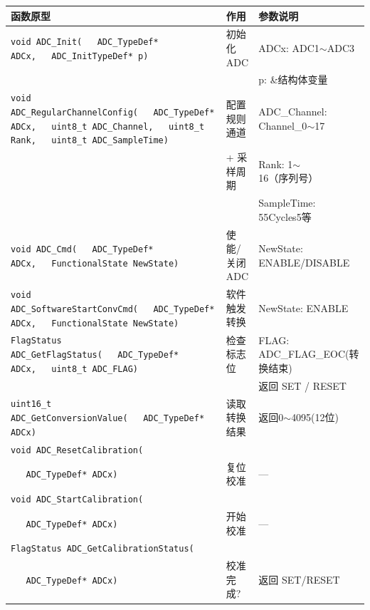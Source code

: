 \documentclass[10pt,a4paper,oneside]{ctexart}
\begin{document}
\begin{center}
\begin{tabular}{@{}p{5.8cm}p{2cm}p{3.2cm}@{}}
    \toprule
    \textbf{函数原型} & \textbf{作用} & \textbf{参数说明} \\
    \midrule
    \texttt{void ADC\_Init(}\newline\texttt{~~~ADC\_TypeDef* ADCx,}\newline\texttt{~~~ADC\_InitTypeDef* p)} & 初始化ADC & ADCx: ADC1$\sim$ADC3 \\
     &  & p: \&结构体变量 \\
    \midrule
    \texttt{void ADC\_RegularChannelConfig(}\newline\texttt{~~~ADC\_TypeDef* ADCx,}\newline\texttt{~~~uint8\_t ADC\_Channel,}\newline\texttt{~~~uint8\_t Rank,}\newline\texttt{~~~uint8\_t ADC\_SampleTime)} & 配置规则通道 & ADC\_Channel: Channel\_0$\sim$17 \\
     & + 采样周期 & Rank: 1$\sim$16（序列号） \\
     &  & SampleTime: 55Cycles5等 \\
    \midrule
    \texttt{void ADC\_Cmd(}\newline\texttt{~~~ADC\_TypeDef* ADCx,}\newline\texttt{~~~FunctionalState NewState)} & 使能/关闭ADC & NewState: ENABLE/DISABLE \\
    \midrule
    \texttt{void ADC\_SoftwareStartConvCmd(}\newline\texttt{~~~ADC\_TypeDef* ADCx,}\newline\texttt{~~~FunctionalState NewState)} & 软件触发转换 & NewState: ENABLE \\
    \midrule
    \texttt{FlagStatus ADC\_GetFlagStatus(}\newline\texttt{~~~ADC\_TypeDef* ADCx,}\newline\texttt{~~~uint8\_t ADC\_FLAG)} & 检查标志位 & FLAG: ADC\_FLAG\_EOC(转换结束) \\
     &  & 返回 SET / RESET \\
    \midrule
    \texttt{uint16\_t ADC\_GetConversionValue(}\newline\texttt{~~~ADC\_TypeDef* ADCx)} & 读取转换结果 & 返回0$\sim$4095(12位) \\
    \midrule
    \texttt{void ADC\_ResetCalibration(}\\\texttt{~~~ADC\_TypeDef* ADCx)} & 复位校准 & --- \\
    \texttt{void ADC\_StartCalibration(}\\\texttt{~~~ADC\_TypeDef* ADCx)} & 开始校准 & --- \\
    \texttt{FlagStatus ADC\_GetCalibrationStatus(}\\\texttt{~~~ADC\_TypeDef* ADCx)} & 校准完成? & 返回 SET/RESET \\
    \bottomrule
\end{tabular}
\end{center}
\end{document}
